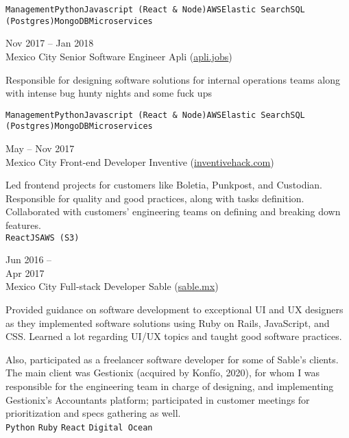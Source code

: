 \documentclass[9pt]{developercv} %
\begin{document}
\begin{entrylist}
{            \texttt{Management}\slashsep\texttt{Python}\slashsep\texttt{Javascript (React \& Node)}\slashsep\texttt{AWS}\slashsep\texttt{Elastic Search}\slashsep\texttt{SQL (Postgres)}\slashsep\texttt{MongoDB}\slashsep\texttt{Microservices}
        }

    \entry
        {
            Nov 2017 -- Jan 2018
            \\\footnotesize{Mexico City}
        }
        {Senior Software Engineer}
        {Apli ({\href{https://apli.jobs/}{\underline{apli.jobs}}})}
        {
            Responsible for designing software solutions for internal operations teams along with intense bug hunty nights and some fuck ups

            \texttt{Management}\slashsep\texttt{Python}\slashsep\texttt{Javascript (React \& Node)}\slashsep\texttt{AWS}\slashsep\texttt{Elastic Search}\slashsep\texttt{SQL (Postgres)}\slashsep\texttt{MongoDB}\slashsep\texttt{Microservices}
        }

    \entry
        {
            May -- Nov 2017
            \\\footnotesize{Mexico City}
        }
        {Front-end Developer}
        {Inventive ({\href{https://www.linkedin.com/company/inventivehack/}{\underline{inventivehack.com}}})}
        {
            Led frontend projects for customers like Boletia, Punkpost, and Custodian. Responsible for quality and good practices, along with tasks definition. Collaborated with customers' engineering teams on defining and breaking down features.\\
            
            \texttt{ReactJS}\slashsep\texttt{AWS (S3)}

        }

    \entry
        {
            Jun 2016 -- \\Apr 2017
            \\\footnotesize{Mexico City}
        }
        {Full-stack Developer}
        {Sable ({\href{https://sable.mx/}{\underline{sable.mx}}})}
        {
            Provided guidance on software development to exceptional UI and UX designers as they implemented software solutions using Ruby on Rails, JavaScript, and CSS. Learned a lot regarding UI/UX topics and taught good software practices. 

            Also, participated as a freelancer software developer for some of Sable's clients. The main client was Gestionix (acquired by Konfío, 2020), for whom I was responsible for the engineering team in charge of designing, and implementing Gestionix's Accountants platform; participated in customer meetings for prioritization and specs gathering as well.\\
            \texttt{Python}
            \slashsep\texttt{Ruby}
            \slashsep\texttt{React}
            \slashsep\texttt{Digital Ocean}
        }


\end{entrylist}
\end{document}

